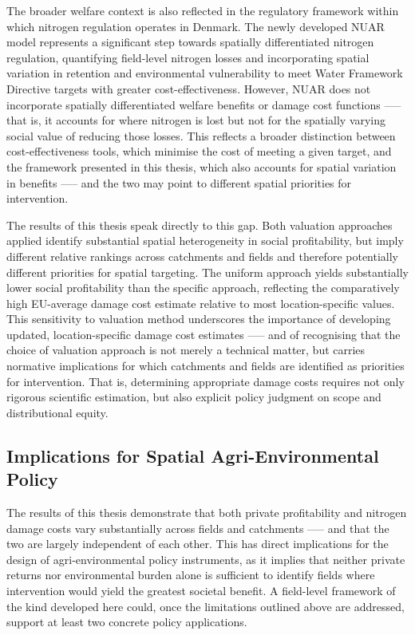 \documentclass[12pt]{article}
\begin{document}
The broader welfare context is also reflected in the regulatory framework within which nitrogen regulation operates in Denmark. The newly developed NUAR model \citep{Eriksen2024} represents a significant step towards spatially differentiated nitrogen regulation, quantifying field-level nitrogen losses and incorporating spatial variation in retention and environmental vulnerability to meet Water Framework Directive targets with greater cost-effectiveness. However, NUAR does not incorporate spatially differentiated welfare benefits or damage cost functions  --— that is, it accounts for where nitrogen is lost but not for the spatially varying social value of reducing those losses. This reflects a broader distinction between cost-effectiveness tools, which minimise the cost of meeting a given target, and the framework presented in this thesis, which also accounts for spatial variation in benefits —-- and the two may point to different spatial priorities for intervention.



The results of this thesis speak directly to this gap. Both valuation approaches applied identify substantial spatial heterogeneity in social profitability, but imply different relative rankings across catchments and fields and therefore potentially different priorities for spatial targeting. The uniform approach yields substantially lower social profitability than the specific approach, reflecting the comparatively high EU-average damage cost estimate relative to most location-specific values. This sensitivity to valuation method underscores the importance of developing updated, location-specific damage cost estimates —-- and of recognising that the choice of valuation approach is not merely a technical matter, but carries normative implications for which catchments and fields are identified as priorities for intervention. That is, determining appropriate damage costs requires not only rigorous scientific estimation,
but also explicit policy judgment on scope and distributional equity.



\subsection{Implications for Spatial Agri-Environmental Policy}

The results of this thesis demonstrate that both private profitability and nitrogen damage costs vary substantially across fields and catchments —-- and that the two are largely independent of each other. This has direct implications for the design of agri-environmental policy instruments, as it implies that neither private returns nor environmental burden alone is sufficient to identify fields where intervention would yield the greatest societal benefit. A field-level framework of the kind developed here could, once the limitations outlined above are addressed, support at least two concrete policy applications.
\end{document}
